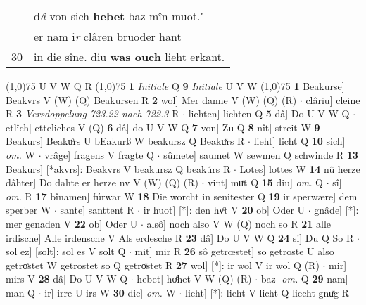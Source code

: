 \documentclass[8pt,a4paper,notitlepage]{article}
\begin{document}
\begin{table}[ht]
\begin{minipage}[t]{0.5\linewidth}
\begin{tabular}{rl}
 & d\textit{â} von sich \textbf{hebet} baz mîn muot."\\ 
 & er nam i\textit{r} clâren bruoder hant\\ 
30 & in die sîne. diu \textbf{was ouch} lieht erkant.\\ 
\end{tabular}
\scriptsize
\line(1,0){75} \newline
U V W Q R \newline
\line(1,0){75} \newline
\textbf{1} \textit{Initiale} Q  \textbf{9} \textit{Initiale} U V W  \newline
\line(1,0){75} \newline
\textbf{1} Beakurse] Beakvrs V (W) (Q) Beakursen R \textbf{2} wol] Mer danne V (W) (Q) (R)  $\cdot$ clâriu] cleine R \textbf{3} \textit{Versdoppelung 723.22 nach 722.3} R   $\cdot$ liehten] lichten Q \textbf{5} dâ] Do U V W Q  $\cdot$ etlîch] etteliches V (Q) \textbf{6} dâ] do U V W Q \textbf{7} von] Zu Q \textbf{8} nît] streit W \textbf{9} Beakurs] Beakuͦrs U bEakurß W beakursz Q Beakuͯrs R  $\cdot$ lieht] licht Q \textbf{10} sich] \textit{om.} W  $\cdot$ vrâge] fragens V fragte Q  $\cdot$ sûmete] saumet W sewmen Q schwinde R \textbf{13} Beakurs] [*akvrs]: Beakvrs V beakursz Q beakúrs R  $\cdot$ Lotes] lottes W \textbf{14} nû herze dâhter] Do dahte er herze nv V (W) (Q) (R)  $\cdot$ vint] muͯt Q \textbf{15} diu] \textit{om.} Q  $\cdot$ sî] \textit{om.} R \textbf{17} bînamen] fúrwar W \textbf{18} Die worcht in senitester Q \textbf{19} ir sperwære] dem sperber W  $\cdot$ sante] santtent R  $\cdot$ ir huot] [*]: den hvͦt V \textbf{20} ob] Oder U  $\cdot$ gnâde] [*]: mer genaden V \textbf{22} ob] Oder U  $\cdot$ alsô] noch also V W (Q) noch so R \textbf{21} alle irdische] Alle irdensche V Als erdesche R \textbf{23} dâ] Do U V W Q \textbf{24} si] Du Q So R  $\cdot$ sol ez] [solt]: sol es V solt Q  $\cdot$ mit] mir R \textbf{26} sô getrœstet] so getroste U also getroͤstet W getrostet so Q getroͯstet R \textbf{27} wol] [*]: ir wol V ir wol Q (R)  $\cdot$ mir] mirs V \textbf{28} dâ] Do U V W Q  $\cdot$ hebet] hoͤhet V W (Q) (R)  $\cdot$ baz] \textit{om.} Q \textbf{29} nam] man Q  $\cdot$ ir] irre U irs W \textbf{30} die] \textit{om.} W  $\cdot$ lieht] [*]: lieht V licht Q liecht gnuͯg R \newline
\end{minipage}
\end{table}
\end{document}
